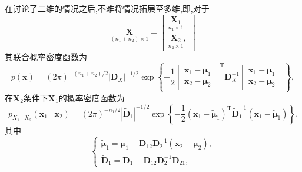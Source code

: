 \documentclass[cn,10pt,citestyle=gb7714-2015,bibstyle=gb7714-2015]{elegantbook}
\newcommand{\mT}{\mathrm{T}}
\begin{document}
  在讨论了二维的情况之后,不难将情况拓展至多维,即,对于
  \[
      \underset{(n_1+n_2)\times 1}{\bm{X}}=\begin{bmatrix}
        \underset{n_1\times 1}{\bm{X}_1}\\
        \underset{n_2\times 1}{\bm{X}_2},
      \end{bmatrix}
  \]
  其联合概率密度函数为
  \begin{equation}
    p(\bm{x})=(2\pi)^{-(n_1+n_2)/2}|\bm{D}_X|^{-1/2}\exp\left\{-\frac12\begin{bmatrix}
      \bm{x}_1-\bm{\mu}_1\\
      \bm{x}_2-\bm{\mu}_2
    \end{bmatrix}^\mT\bm{D}_X^{-1}\begin{bmatrix}
      \bm{x}_1-\bm{\mu}_1\\
      \bm{x}_2-\bm{\mu}_2
    \end{bmatrix}\right\},
  \end{equation}
  在$\bm{X}_2$条件下$\bm{X}_1$的概率密度函数为
  \begin{equation}\label{eq:conditional-PDF}
    p_{X_1\mid X_2}(\bm{x}_1\mid\bm{x}_2)=(2\pi)^{-n_1/2}|\widetilde{\bm{D}}_1|^{-1/2}\exp\left\{-\frac12(\bm{x}_1-\widetilde{\bm{\mu}}_1)^\mT\widetilde{\bm{D}}_1^{-1}(\bm{x}_1-\widetilde{\bm{\mu}}_1)\right\}.
  \end{equation}
  其中
  \begin{equation}
    \begin{cases}
      \widetilde{\bm{\mu}}_1=\bm{\mu}_1+\bm{D}_{12}\bm{D}_2^{-1}(\bm{x}_2-\bm{\mu}_2),\\
      \widetilde{\bm{D}}_1=\bm{D}_1-\bm{D}_{12}\bm{D}_2^{-1}\bm{D}_{21},
    \end{cases}
  \end{equation}
\end{document}

